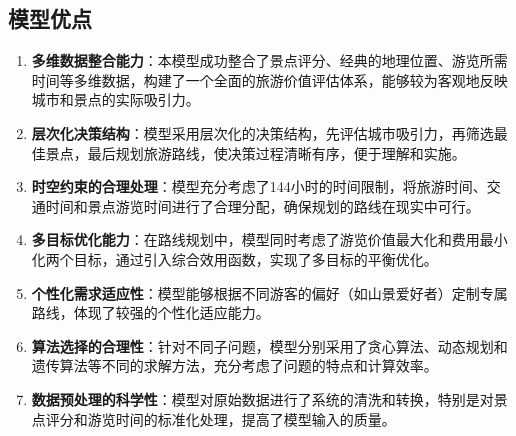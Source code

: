 \documentclass[withoutpreface,bwprint]{cumcmthesis} %
\begin{document}
\subsection{模型优点}
\begin{enumerate}
    \item \textbf{多维数据整合能力}：本模型成功整合了景点评分、经典的地理位置、游览所需时间等多维数据，构建了一个全面的旅游价值评估体系，能够较为客观地反映城市和景点的实际吸引力。
    
    \item \textbf{层次化决策结构}：模型采用层次化的决策结构，先评估城市吸引力，再筛选最佳景点，最后规划旅游路线，使决策过程清晰有序，便于理解和实施。
    
    \item \textbf{时空约束的合理处理}：模型充分考虑了144小时的时间限制，将旅游时间、交通时间和景点游览时间进行了合理分配，确保规划的路线在现实中可行。
    
    \item \textbf{多目标优化能力}：在路线规划中，模型同时考虑了游览价值最大化和费用最小化两个目标，通过引入综合效用函数，实现了多目标的平衡优化。
    
    \item \textbf{个性化需求适应性}：模型能够根据不同游客的偏好（如山景爱好者）定制专属路线，体现了较强的个性化适应能力。
    
    \item \textbf{算法选择的合理性}：针对不同子问题，模型分别采用了贪心算法、动态规划和遗传算法等不同的求解方法，充分考虑了问题的特点和计算效率。
    
    \item \textbf{数据预处理的科学性}：模型对原始数据进行了系统的清洗和转换，特别是对景点评分和游览时间的标准化处理，提高了模型输入的质量。
\end{enumerate}
\end{document}

